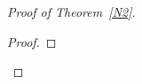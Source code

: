 \documentclass[10pt,a4paper]{amsart}
\numberwithin{equation}{section}
\begin{document}
\begin{proof}[Proof of Theorem~\ref{N2}]
\begin{proof}
%
%
%
%
%
%

\end{proof}
\end{proof}
\end{document}

